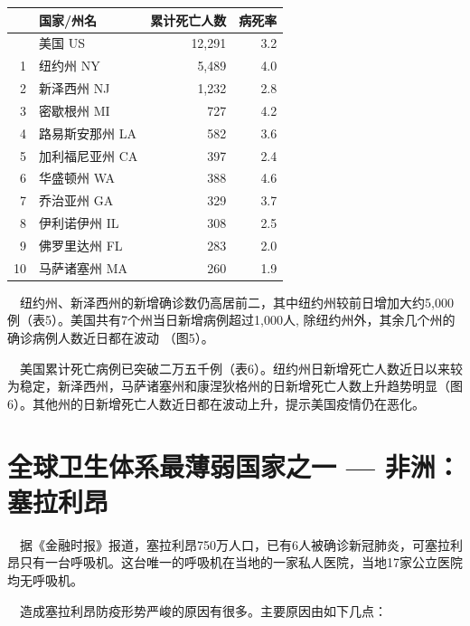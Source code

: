 \documentclass[
]{article}
\begin{document}
\begin{table}
\begin{minipage}{.45\linewidth}
\begin{table}[H]
\begin{tabular}{rlrr}
\toprule
  & 国家/州名 & 累计死亡人数 & 病死率\\
\midrule
\rowcolor{gray!6}   & 美国 US & 12,291 & 3.2\\
1 & 纽约州 NY & 5,489 & 4.0\\
\rowcolor{gray!6}  2 & 新泽西州 NJ & 1,232 & 2.8\\
3 & 密歇根州 MI & 727 & 4.2\\
\rowcolor{gray!6}  4 & 路易斯安那州 LA & 582 & 3.6\\
5 & 加利福尼亚州 CA & 397 & 2.4\\
\rowcolor{gray!6}  6 & 华盛顿州 WA & 388 & 4.6\\
7 & 乔治亚州 GA & 329 & 3.7\\
\rowcolor{gray!6}  8 & 伊利诺伊州 IL & 308 & 2.5\\
9 & 佛罗里达州 FL & 283 & 2.0\\
\rowcolor{gray!6}  10 & 马萨诸塞州 MA & 260 & 1.9\\
\bottomrule
\end{tabular}
\endgroup{}
\end{table} \end{minipage} 
\end{table}

\(\quad\)纽约州、新泽西州的新增确诊数仍高居前二，其中纽约州较前日增加大约5,000例（表5）。美国共有7个州当日新增病例超过1,000人,
除纽约州外，其余几个州的确诊病例人数近日都在波动 （图5）。

\(\quad\)美国累计死亡病例已突破二万五千例（表6）。纽约州日新增死亡人数近日以来较为稳定，新泽西州，马萨诸塞州和康涅狄格州的日新增死亡人数上升趋势明显（图6）。其他州的日新增死亡人数近日都在波动上升，提示美国疫情仍在恶化。

%
  \noindent{}%

\hypertarget{section-4}{%
\section{\texorpdfstring{\textcolor{glaucous}{\Huge 全球卫生体系最薄弱国家之一 — 非洲：塞拉利昂}}{}}\label{section-4}}

\(\quad\)据《金融时报》报道，塞拉利昂750万人口，已有6人被确诊新冠肺炎，可塞拉利昂只有一台呼吸机。这台唯一的呼吸机在当地的一家私人医院，当地17家公立医院均无呼吸机。

\(\quad\)造成塞拉利昂防疫形势严峻的原因有很多。主要原因由如下几点：
\end{document}
